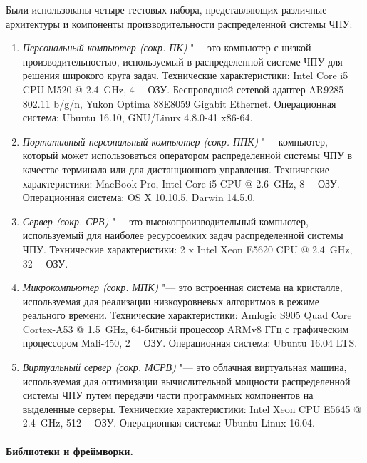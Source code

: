 Были использованы четыре тестовых набора, представляющих различные архитектуры и компоненты производительности распределенной системы ЧПУ:

\begin{enumerate}
	\item \textit{Персональный компьютер (сокр. ПК)} "--- это компьютер с низкой производительностью, используемый в распределенной системе ЧПУ для решения широкого круга задач. Технические характеристики: Intel Core i5 CPU M520 @ \SI{2,4}{\giga\hertz}, \SI{4}{\gibi\byte} ОЗУ. Беспроводной сетевой адаптер AR9285 802.11 b/g/n, Yukon Optima 88E8059 Gigabit Ethernet. Операционная система: Ubuntu 16.10, GNU/Linux 4.8.0-41 x86-64.
	
	\item \textit{Портативный персональный компьютер (сокр. ППК)} "---  компьютер, который может использоваться оператором распределенной системы ЧПУ в качестве терминала или для дистанционного управления. Технические характеристики: MacBook Pro, Intel Core i5 CPU @ \SI{2,6}{\giga\hertz}, \SI{8}{\gibi\byte} ОЗУ.
	Операционная система: OS X 10.10.5, Darwin 14.5.0.
	\item \textit{Сервер (сокр. СРВ)} "--- это высокопроизводительный компьютер, используемый для наиболее ресурсоемких задач распределенной системы ЧПУ. Технические характеристики: 2 x Intel Xeon E5620 CPU @ \SI{2,4}{\giga\hertz}, \SI{32}{\gibi\byte} ОЗУ.
	
	\item \textit{Микрокомпьютер (сокр. МПК)} "--- это встроенная система на кристалле, используемая для реализации низкоуровневых алгоритмов в режиме реального времени. Технические характеристики: Amlogic S905 Quad Core Cortex-A53 @ \SI{1,5}{\giga\hertz}, 64-битный процессор ARMv8 ГГц с графическим процессором Mali-450, \SI{2}{\gibi\byte} ОЗУ.
	Операционная система: Ubuntu 16.04 LTS.
	
	\item \textit{Виртуальный сервер (сокр. МСРВ)} "--- это облачная виртуальная машина, используемая для оптимизации вычислительной мощности распределенной системы ЧПУ путем передачи части программных компонентов на выделенные серверы. Технические характеристики: Intel Xeon CPU E5645 @ \SI{2,4}{\giga\hertz}, \SI{512}{\mebi\byte} ОЗУ. Операционная система: Ubuntu Linux 16.04.
\end{enumerate}

\paragraph{Библиотеки и фреймворки.}

